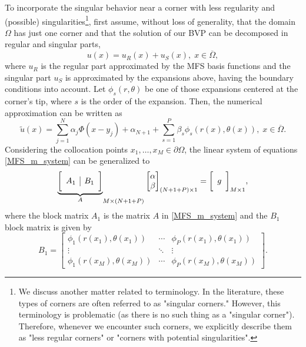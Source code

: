To incorporate the singular behavior near a corner with less regularity and (possible) singularities\footnote{We discuss another matter related to terminology. In the literature, these types of corners are often referred to as "singular corners." However, this terminology is problematic (as there is no such thing as a "singular corner"). Therefore, whenever we encounter such corners, we explicitly describe them as "less regular corners" or "corners with potential singularities".}, first assume, without loss of generality, that the domain \(\Omega\) has just one corner and that the solution of our \ac{BVP} can be decomposed in regular and singular parts,
\[
    u(x) = u_R(x) + u_S(x), \; x \in \overline{\Omega},
\]
where \(u_R\) is the regular part approximated by the \ac{MFS} basis functions and the singular part \(u_S\) is approximated by the expansions above, having the boundary conditions into account. Let \(\phi_s(r, \theta)\) be one of those expansions centered at the corner's tip, where \(s\) is the order of the expansion. Then, the numerical approximation can be written as
\begin{equation}
    \tilde{u}(x) = \sum_{j=1}^{N}\alpha_j \Phi(x-y_j) + \alpha_{N+1} + \sum_{s=1}^{P} \beta_s \phi_s(r(x),\theta(x)), \; x \in \overline{\Omega}.
\end{equation}
Considering the collocation points \(x_1,\dots,x_M \in \partial \Omega\), the linear system of equations \eqref{MFS_m_system} can be generalized to
\begin{equation}
    {\underbrace{\bigg[ \begin{array}{c | c}
        A_1 & B_1 \\
    \end{array} \bigg]}_{A}}_{M\times(N+1+P)}
    \begin{bmatrix}
        \alpha\\
        \beta
    \end{bmatrix}_{(N+1+P)\times 1}
    =
    \bigg[ \begin{array}{c}
        g \\
    \end{array} \bigg]_{M\times 1},
\end{equation}
where the block matrix \(A_1\) is the matrix \(A\) in \eqref{MFS_m_system} and the \(B_1\) block matrix is given by
\[
    B_1=\begin{bmatrix}
        \phi_1(r(x_1), \theta(x_1)) & \cdots & \phi_P(r(x_1), \theta(x_1)) \\
        \vdots & \ddots & \vdots\\
        \phi_1(r(x_M), \theta(x_M)) & \cdots & \phi_P(r(x_M), \theta(x_M))
    \end{bmatrix}.
\]


